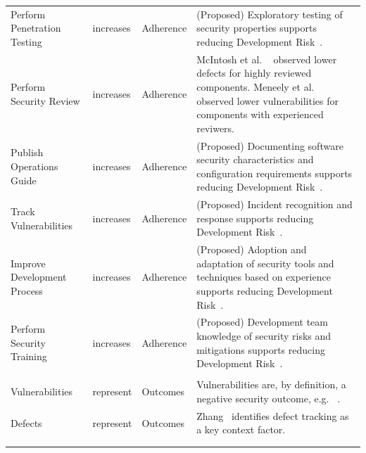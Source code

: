 \begin{table}[!htbp]
\begin{scriptsize}
\begin{tabular}{p{1.75cm}p{1cm}p{1cm}p{6cm}}
			Perform Penetration Testing &	increases &	Adherence	& (Proposed)  Exploratory testing of security properties supports reducing Development Risk~\cite{morrison2017surveying}.\\
			Perform Security Review &	increases &	Adherence	&  McIntosh et al. ~\cite{mcintosh2014the} observed lower defects for highly reviewed components. Meneely et al. ~\cite{meneely2014empirical} observed lower vulnerabilities for components with experienced reviwers. \\
			Publish Operations Guide &	increases	& Adherence & (Proposed) Documenting software security characteristics and configuration requirements supports reducing Development Risk~\cite{morrison2017surveying}.\\
			Track Vulnerabilities &	increases &	Adherence & (Proposed) Incident recognition and response supports reducing Development Risk~\cite{morrison2017surveying}.\\	
			Improve Development Process &	increases &	Adherence & (Proposed)  Adoption and adaptation of security tools and techniques based on experience supports reducing Development Risk~\cite{morrison2017surveying}.\\	
			Perform Security Training &	increases &	Adherence	& (Proposed) Development team knowledge of security risks and mitigations supports reducing Development Risk~\cite{morrison2017surveying}.\\		
			\hline \\[-1.8ex] 
			Vulnerabilities	& represent & Outcomes &  Vulnerabilities are, by definition, a negative security outcome, e.g. ~\cite{alhazmi2007measuring}.\\
			Defects & represent & Outcomes	& Zhang~\cite{zhang2014towards} identifies defect tracking as a key context factor.\\		
			\hline \\[-1.8ex] 
			\hline \\[-1.8ex] 
		\end{tabular} 
	\end{scriptsize}
\end{table} 
